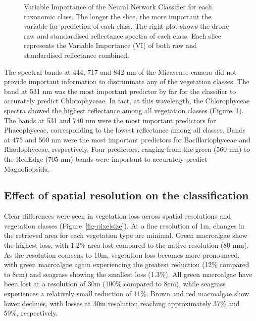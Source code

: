 \documentclass[
  letterpaper,
  11pt,
  english,
  singlespacing,
  headsepline]{MastersDoctoralThesis}
\begin{document}
\begin{spacing}{1.5}
\begin{figure}
{}

\caption{\label{fig-VIP}Variable Importance of the Neural Network
Classifier for each taxonomic class. The longer the slice, the more
important the variable for prediction of each class. The right plot
shows the drone raw and standardised reflectance spectra of each class.
Each slice represents the Variable Importance (VI) of both raw and
standardised reflectance combined.}

\end{figure}%

The spectral bands at 444, 717 and 842 nm of the Micasense camera did
not provide important information to discriminate any of the vegetation
classes. The band at 531 nm was the most important predictor by far for
the classifier to accurately predict Chlorophyceae. In fact, at this
wavelength, the Chlorophyceae spectra showed the highest reflectance
among all vegetation classes (Figure~\ref{fig-VIP}). The bands at 531
and 740 nm were the most important predictors for Phaeophyceae,
corresponding to the lowest reflectance among all classes. Bands at 475
and 560 nm were the most important predictors for Bacillariophyceae and
Rhodophyceae, respectively. Four predictors, ranging from the green (560
nm) to the RedEdge (705 nm) bands were important to accurately predict
Magnoliopsida.

\subsection{Effect of spatial resolution on the
classification}\label{effect-of-spatial-resolution-on-the-classification}

Clear differences were seen in vegetation loss across spatial
resolutions and vegetation classes (Figure~\ref{fig-pixelsize}). At a
fine resolution of 1m, changes in the retrieved area for each vegetation
type are minimal. Green macroalgae show the highest loss, with 1.2\%
area lost compared to the native resolution (80 mm). As the resolution
coarsens to 10m, vegetation loss becomes more pronounced, with green
macroalgae again experiencing the greatest reduction (12\% compared to
8cm) and seagrass showing the smallest loss (1.3\%). All green
macroalgae have been lost at a resolution of 30m (100\% compared to
8cm), while seagrass experiences a relatively small reduction of 11\%.
Brown and red macroalgae show lower declines, with losses at 30m
resolution reaching approximately 37\% and 59\%, respectively.

\begin{figure}


\end{figure}
\end{spacing}
\end{document}
